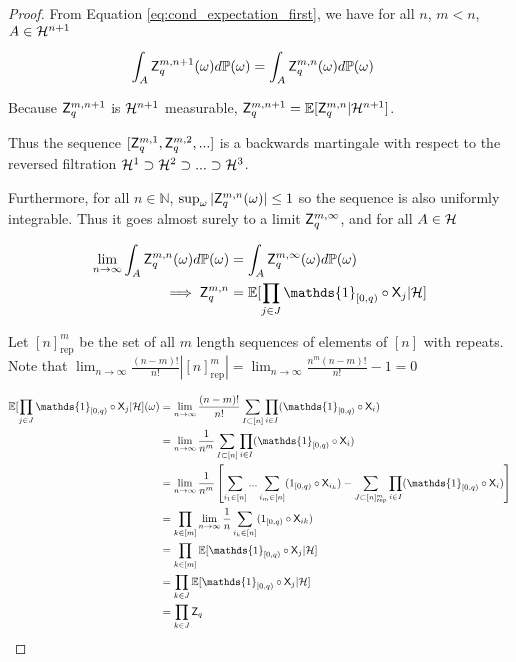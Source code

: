 \begin{proof}
From Equation \ref{eq:cond_expectation_first}, we have for all $n$, $m<n$, $A\in \mathcal{H}^{n+1}$

\begin{align}
    \int_{A} \mathsf{Z}_q^{m,n+1} (\omega) d\mathbb{P}(\omega) &= \int_{A} \mathsf{Z}_q^{m,n} (\omega) d\mathbb{P}(\omega)
\end{align}

Because $\mathsf{Z}_q^{m,n+1}$ is $\mathcal{H}^{n+1}$ measurable, $\mathsf{Z}_q^{m,n+1} = \mathbb{E}[\mathsf{Z}_q^{m,n}|\mathcal{H}^{n+1}]$.

Thus the sequence $[\mathsf{Z}^{m,1}_q,\mathsf{Z}^{m,2}_q,...]$ is a backwards martingale with respect to the reversed filtration $\mathcal{H}^1\supset\mathcal{H}^2\supset...\supset \mathcal{H}^3$.

Furthermore, for all $n\in \mathbb{N}$, $\sup_\omega|\mathsf{Z}^{m,n}_q(\omega)|\leq 1$ so the sequence is also uniformly integrable. Thus it goes almost surely to a limit $\mathsf{Z}^{m,\infty}_q$, and for all $A\in \mathcal{H}$

\begin{align}
    \lim_{n\to\infty} \int_A \RV{Z}^{m,n}_q(\omega) d\prob{P}(\omega) &= \int_A \RV{Z}^{m,\infty}_q(\omega) d\prob{P}(\omega)\\
    \implies \RV{Z}^{m,n}_q &= \mathbb{E}[\prod_{j\in J} \mathds{1}_{[0,q)}\circ \RV{X}_j|\sigalg{H}]
\end{align}

Let $[n]^m_\mathrm{rep}$ be the set of all $m$ length sequences of elements of $[n]$ with repeats. Note that $\lim_{n\to\infty}\frac{(n-m)!}{n!}|[n]^m_\mathrm{rep}| = \lim_{n\to\infty}\frac{n^m(n-m)!}{n!}-1 = 0$

\begin{align}
    \mathbb{E}[\prod_{j\in J} \mathds{1}_{[0,q)}\circ \RV{X}_j|\sigalg{H}](\omega) &= \lim_{n\to\infty}\frac{(n-m)!}{n!}\sum_{I\subset[n]}\prod_{i\in I} (\mathds{1}_{[0,q)}\circ \RV{X}_i)\\
                                                                      &= \lim_{n\to\infty}\frac{1}{n^m}\sum_{I\subset[n]}\prod_{i\in I}(\mathds{1}_{[0,q)}\circ \RV{X}_i)\\
                                                                      &= \lim_{n\to\infty}\frac{1}{n^m}\left[\sum_{i_1\in [n]}...\sum_{i_m\in [n]} (1_{[0,q)}\circ \RV{X}_{i_k})-\sum_{J\subset[n]^m_\mathrm{rep}}\prod_{i\in I} (\mathds{1}_{[0,q)}\circ \RV{X}_i)\right]\\ 
                                                                      &= \prod_{k\in [m]} \lim_{n\to\infty} \frac{1}{n}\sum_{i_k\in[n]}(1_{[0,q)}\circ\RV{X}_{ik})\\
                                                                      &= \prod_{k\in [m]} \mathbb{E}[\mathds{1}_{[0,q)}\circ \RV{X}_j|\sigalg{H}]\\
                                                                      &= \prod_{k\in J} \mathbb{E}[\mathds{1}_{[0,q)}\circ \RV{X}_j|\sigalg{H}]\\
                                                                      &= \prod_{k\in J} \RV{Z}_q\label{eq:h_measurable}
\end{align}


\end{proof}
